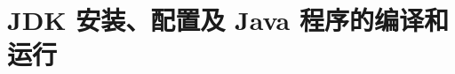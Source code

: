 ﻿\documentclass[cs4size,a4paper,nofonts,twoside]{ctexart}
\begin{document}

\setcounter{section}{0}
\section{JDK 安装、配置及 Java 程序的编译和运行}

{\linespread{1}}

{\linespread{1}}

{\linespread{1}}

{\linespread{1}}
\end{document}
